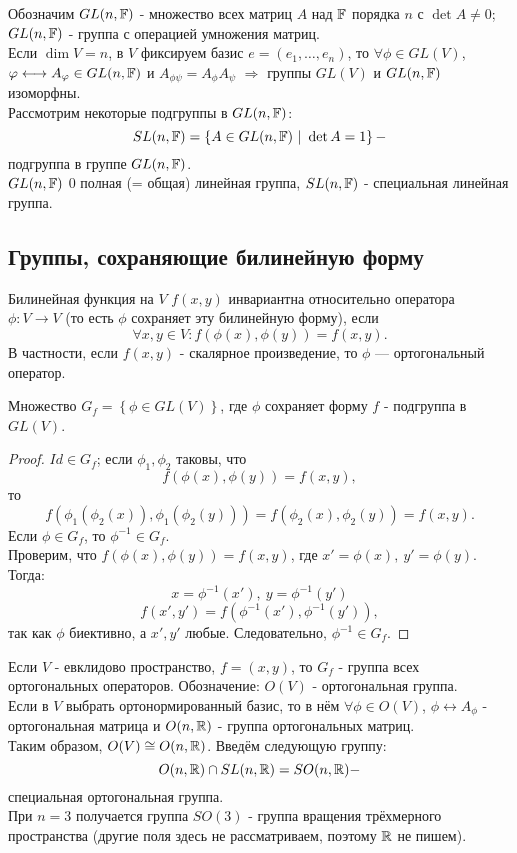 \begin{example1}
    Обозначим $GL(n, \mathbb{F})$ - множество всех матриц $A$ над $\mathbb{F}$ порядка $n$ с $\det{A} \neq 0$; $GL(n, \mathbb{F})$ - группа с операцией умножения матриц.\\
    Если $\dim{V} = n$, в $V$ фиксируем базис $e = (e_1, \dots, e_n)$, то $\forall \phi \in GL(V)$, $\varphi \longleftrightarrow A_{\varphi} \in GL(n, \mathbb{F})$ и $A_{\phi \psi} = A_{\phi}A_{\psi}$ $\Longrightarrow$ группы $GL(V)$ и $GL(n, \mathbb{F})$ изоморфны.\\
    Рассмотрим некоторые подгруппы в $GL(n, \mathbb{F})$:
    \[SL(n, \mathbb{F}) = \left\{A \in GL(n, \mathbb{F}) \ | \ \det{A} = 1\right\} - \]
    подгруппа  в группе $GL(n, \mathbb{F})$.\\
    $GL(n, \mathbb{F})$ 0 полная (= общая) линейная группа, $SL(n, \mathbb{F})$ - специальная линейная группа.
\end{example1}
\subsection{Группы, сохраняющие билинейную форму}
\begin{definition}
    Билинейная функция на $V$ $f(x,y)$ инвариантна относительно оператора $\phi: V \to V$ (то есть $\phi$ сохраняет эту билинейную форму), если \[\forall x, y \in V: f(\phi(x), \phi(y)) = f(x,y).\]
    В частности, если $f(x,y)$ - скалярное произведение, то $\phi$ — ортогональный оператор.
\end{definition} 
\begin{lemma}
    Множество $G_f = \left\{\phi \in GL(V)\right\}$, где $\phi$ сохраняет форму $f$ - подгруппа в $GL(V)$.
\end{lemma} 
\begin{proof}
    $Id \in G_f$; если $\phi_1, \phi_2$ таковы, что 
    \[f(\phi(x), \phi(y)) = f(x,y),\]
    то 
    \[f(\phi_1(\phi_2(x)), \phi_1(\phi_2(y))) = f(\phi_2(x), \phi_2(y)) = f(x,y).\]
    Если $\phi \in G_f$, то $\phi^{-1} \in G_f$.\\
    Проверим, что $f(\phi(x), \phi(y)) = f(x,y)$, где $x' = \phi(x), \ y' = \phi(y)$. Тогда: 
    $$x = \phi^{-1}(x'), \ y = \phi^{-1}(y')$$
    \[f(x',y') = f(\phi^{-1}(x'), \phi^{-1}(y')),\]
    так как $\phi$ биективно, а $x',y'$ любые. Следовательно, $\phi^{-1} \in G_f$.
\end{proof} 
Если $V$ - евклидово пространство, $f = (x,y)$, то $G_f$ - группа всех ортогональных операторов. Обозначение: $O(V)$ - ортогональная группа.\\
Если в $V$ выбрать ортонормированный базис, то в нём $\forall \phi \in O(V)$, $\phi \longleftrightarrow A_{\phi}$ - ортогональная матрица и $O(n, \mathbb{R})$ - группа ортогональных матриц.\\
Таким образом, $O(V) \cong O(n, \mathbb{R})$. Введём следующую группу:
\[O(n, \mathbb{R}) \cap SL(n, \mathbb{R}) = SO(n, \mathbb{R}) - \]
специальная ортогональная группа.\\
При $n = 3$ получается группа $SO(3)$ - группа вращения трёхмерного пространства (другие поля здесь не рассматриваем, поэтому $\mathbb{R}$ не пишем).
